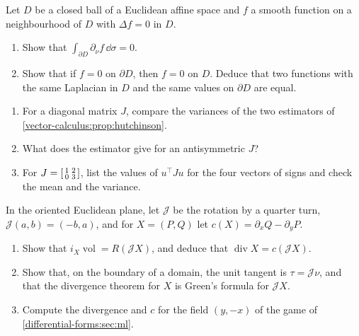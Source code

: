 \begin{notechapter}
\begin{exercise}\label{vector-calculus:exr:6}
Let $D$ be a closed ball of a Euclidean affine space and $f$ a smooth
function on a neighbourhood of $D$ with $\Delta f = 0$ in $D$.
\begin{enumerate}[nosep]
  \item Show that $\int_{\partial D}\partial_\nu f\,\dd\sigma = 0$.
  \item Show that if $f = 0$ on $\partial D$, then $f = 0$ on $D$.
        Deduce that two functions with the same Laplacian in $D$ and
        the same values on $\partial D$ are equal.
\end{enumerate}
\end{exercise}

\begin{exercise}\label{vector-calculus:exr:7}
\begin{enumerate}[nosep]
  \item For a diagonal matrix $J$, compare the variances of the two
        estimators of \cref{vector-calculus:prop:hutchinson}.
  \item What does the estimator give for an antisymmetric $J$?
  \item For $J = \begin{bsmallmatrix}1 & 2\\ 0 & 3\end{bsmallmatrix}$,
        list the values of $u^\top Ju$ for the four vectors of signs
        and check the mean and the variance.
\end{enumerate}
\end{exercise}

\begin{exercise}\label{vector-calculus:exr:8}
In the oriented Euclidean plane, let $\mathcal J$ be the rotation by a
quarter turn, $\mathcal J(a, b) = (-b, a)$, and for $X = (P, Q)$ let
$c(X) = \partial_xQ - \partial_yP$.
\begin{enumerate}[nosep]
  \item Show that $i_X\operatorname{vol} = R(\mathcal JX)$, and deduce
        that $\operatorname{div}X = c(\mathcal JX)$.
  \item Show that, on the boundary of a domain, the unit tangent is
        $\tau = \mathcal J\nu$, and that the divergence theorem for $X$
        is Green's formula for $\mathcal JX$.
  \item Compute the divergence and $c$ for the field $(y, -x)$ of the
        game of \cref{differential-forms:sec:ml}.
\end{enumerate}
\end{exercise}
\end{notechapter}
